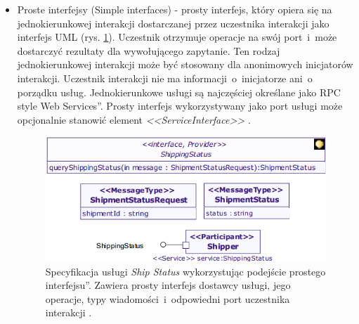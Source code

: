 \begin{itemize}
\item{Proste interfejsy (Simple interfaces) - prosty interfejs, który opiera się na jednokierunkowej interakcji dostarczanej przez uczestnika interakcji jako interfejs UML (rys. \ref{simple_interface_based_approach}). Uczestnik otrzymuje operacje na swój port~i~może dostarczyć rezultaty dla wywołującego zapytanie. Ten rodzaj jednokierunkowej interakcji może być stosowany dla anonimowych inicjatorów interakcji. Uczestnik interakcji nie ma informacji~o~inicjatorze ani~o~ porządku usług. Jednokierunkowe usługi są najczęściej określane jako \quotedblbase RPC style Web Services\textquotedblright. Prosty interfejs wykorzystywany jako port usługi może opcjonalnie stanowić element \emph{<<ServiceInterface>>} \cite{SOAMLOMG}.
\begin{figure}[h!tbp]
\begin{centering}
\includegraphics[width=11cm]{img/simple_interface_based_approach.png}
\caption[Specyfikacja usługi \quotedblbase Ship Status\textquotedblright wykorzystując podejście \quotedblbase prostego interfejsu\textquotedblright. Zawiera prosty interfejs dostawcy usługi, jego operacje, typy wiadomości~i~odpowiedni port uczestnika interakcji.]{Specyfikacja usługi \emph{Ship Status} wykorzystując podejście \quotedblbase prostego interfejsu\textquotedblright. Zawiera prosty interfejs dostawcy usługi, jego operacje, typy wiadomości~i~odpowiedni port uczestnika interakcji \cite{SoaMLErvBase}.}\label{simple_interface_based_approach}
\end{centering}
\end{figure}
} 


\end{itemize}
